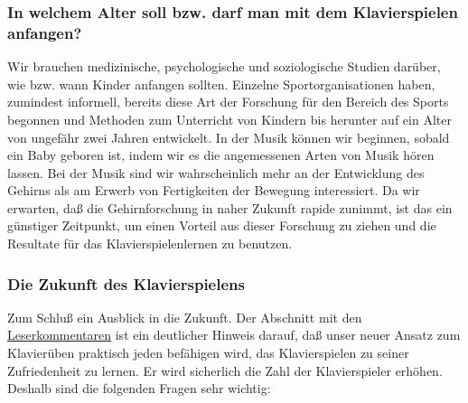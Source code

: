 \subsubsection{In welchem Alter soll bzw. darf man mit dem Klavierspielen anfangen?}
\label{c1iv6g}

Wir brauchen medizinische, psychologische und soziologische Studien darüber, wie bzw. wann Kinder anfangen sollten.
Einzelne Sportorganisationen haben, zumindest informell, bereits diese Art der Forschung für den Bereich des Sports begonnen und Methoden zum Unterricht von Kindern bis herunter auf ein Alter von ungefähr zwei Jahren entwickelt.
In der Musik können wir beginnen, sobald ein Baby geboren ist, indem wir es die angemessenen Arten von Musik hören lassen.
Bei der Musik sind wir wahrscheinlich mehr an der Entwicklung des Gehirns als am Erwerb von Fertigkeiten der Bewegung interessiert.
Da wir erwarten, daß die Gehirnforschung in naher Zukunft rapide zunimmt, ist das ein günstiger Zeitpunkt, um einen Vorteil aus dieser Forschung zu ziehen und die Resultate für das Klavierspielenlernen zu benutzen.


\subsubsection{Die Zukunft des Klavierspielens}
\label{c1iv6h}

Zum Schluß ein Ausblick in die Zukunft.
Der Abschnitt mit den \hyperref[testimonials]{Leserkommentaren} ist ein deutlicher Hinweis darauf, daß unser neuer Ansatz zum Klavierüben praktisch jeden befähigen wird, das Klavierspielen zu seiner Zufriedenheit zu lernen.
Er wird sicherlich die Zahl der Klavierspieler erhöhen.
Deshalb sind die folgenden Fragen sehr wichtig:

